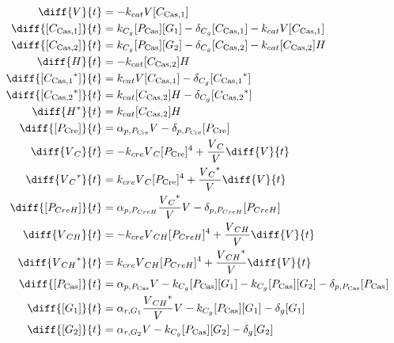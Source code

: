 \begin{align}
\diff{\vectorGen{}}{t} & = - \casCutRate{{}}\vectorGen{}\conc{\cplx{\cas}{1}}\\
\diff{\conc{\cplx{\cas}{1}}}{t} & =  \gRnaBind{}\conc{\proSp{\cas{}}}\conc{\gRna{1}} - \casCompDegradeRate{}\conc{\cplx{\cas}{1}} - \casCutRate{{}}\vectorGen{}\conc{\cplx{\cas}{1}}\\
\diff{\conc{\cplx{\cas}{2}}}{t} & =  \gRnaBind{}\conc{\proSp{\cas{}}}\conc{\gRna{2}} - \casCompDegradeRate{}\conc{\cplx{\cas}{2}} - \casCutRate{{}}\conc{\cplx{\cas}{2}}\hostGen{}\\
\diff{\hostGen{}}{t} & = - \casCutRate{{}}\conc{\cplx{\cas}{2}}\hostGen{}\\
\diff{\conc{\bound{\cplx{\cas}{1}}}}{t} & =  \casCutRate{{}}\vectorGen{}\conc{\cplx{\cas}{1}} - \casCompDegradeRate{}\conc{\bound{\cplx{\cas}{1}}}\\
\diff{\conc{\bound{\cplx{\cas}{2}}}}{t} & =  \casCutRate{{}}\conc{\cplx{\cas}{2}}\hostGen{} - \casCompDegradeRate{}\conc{\bound{\cplx{\cas}{2}}}\\
\diff{\edited{\hostGen{}}}{t} & =  \casCutRate{{}}\conc{\cplx{\cas}{2}}\hostGen{}\\
\diff{\conc{\proSp{\cre{}}}}{t} & =  \txtlRate{\proSp{\cre{}}}\vectorGen{} - \proDegradeRate{\proSp{\cre{}}}\conc{\proSp{\cre{}}}\\
\diff{\vectorGen{}_C}{t} & = - \creCutRate{} \vectorGen{}_C \conc{\proSp{\cre{}}}^4 + \frac{\vectorGen{}_C}{\vectorGen{}} \diff{\vectorGen{}}{t}\\
\diff{\edited{\vectorGen{}_C}}{t} & =  \creCutRate{} \vectorGen{}_C \conc{\proSp{\cre{}}}^4 + \frac{\edited{\vectorGen{}_C}}{\vectorGen{}} \diff{\vectorGen{}}{t}\\
\diff{\conc{\proSp{CreH}}}{t} & =  \txtlRate{\proSp{CreH}}\frac{\edited{\vectorGen{}_C}}{\vectorGen{}}\vectorGen{} - \proDegradeRate{\proSp{CreH}}\conc{\proSp{CreH}}\\
\diff{\vectorGen{}_{CH}}{t} & = - \creCutRate{} \vectorGen{}_{CH} \conc{\proSp{CreH}}^4 + \frac{\vectorGen{}_{CH}}{\vectorGen{}} \diff{\vectorGen{}}{t}\\
\diff{\edited{\vectorGen{}_{CH}}}{t} & =  \creCutRate{} \vectorGen{}_{CH} \conc{\proSp{CreH}}^4 + \frac{\edited{\vectorGen{}_{CH}}}{\vectorGen{}} \diff{\vectorGen{}}{t}\\
\diff{\conc{\proSp{\cas{}}}}{t} & =  \txtlRate{\proSp{\cas{}}}\vectorGen{} - \gRnaBind{}\conc{\proSp{\cas{}}}\conc{\gRna{1}} - \gRnaBind{}\conc{\proSp{\cas{}}}\conc{\gRna{2}} - \proDegradeRate{\proSp{\cas{}}}\conc{\proSp{\cas{}}}\\
\diff{\conc{\gRna{1}}}{t} & =  \txRate{\gRna{1}}\frac{\edited{\vectorGen{}_{CH}}}{\vectorGen{}}\vectorGen{} - \gRnaBind{}\conc{\proSp{\cas{}}}\conc{\gRna{1}} - \rnaDegradeRate{}\conc{\gRna{1}}\\
\diff{\conc{\gRna{2}}}{t} & =  \txRate{\gRna{2}}\vectorGen{} - \gRnaBind{}\conc{\proSp{\cas{}}}\conc{\gRna{2}} - \rnaDegradeRate{}\conc{\gRna{2}}
\end{align}

